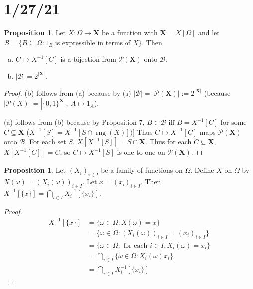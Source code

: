 \documentclass{article}
\DeclareMathOperator{\rng}{rng}
\theoremstyle{definition}
\newtheorem{proposition}[theorem]{Proposition}
\begin{document}
\section*{1/27/21}
\begin{proposition}
Let $X: \Omega \longrightarrow \mathbf{X}$ be a function with $\mathbf{X} = X[\Omega]$ and let $\mathscr{B} = \{B \subseteq \Omega : 1_B$ is expressible in terms of $X\}$.
Then
\begin{enumerate}[(a)]
    \item $C \mapsto X^{-1}[C]$ is a bijection from $\mathcal{P}(\mathbf{X})$ onto $\mathscr{B}$.
    \item $|\mathscr{B}| = 2^{|\mathbf{X}|}$.
\end{enumerate}
\end{proposition}
\begin{proof}
(b) follows from (a) because by (a) $|\mathscr{B}| = |\mathcal{P}(\mathbf{X})| := 2^{|\mathbf{X}|}$ (because $|\mathcal{P}(X)| = |\{0,1\}^\mathbf{X}|, \ A \mapsto 1_A$).

(a) follows from (b) because by Proposition 7, $B \in \mathscr{B}$ iff $B=X^{-1}[C]$ for some $C \subseteq \mathbf{X}$ ($X^{-1}[S] = X^{-1}[S \cap \rng (X)])]$
Thus $C \mapsto X^{-1}[C]$ maps $\mathcal{P}(\mathbf{X})$ onto $\mathscr{B}$.
For each set $S$, $X[X^{-1}[S]] = S \cap \mathbf{X}$.
Thus for each $C \subseteq \mathbf{X}$, $X[X^{-1}[C]] = C$, so $C \mapsto X^{-1}[S]$ is one-to-one on $\mathcal{P}(\mathbf{X})$.
\end{proof}

\begin{proposition}
Let $(X_i)_{i \in I}$ be a family of functions on $\Omega$. Define $X$ on $\Omega$ by $X(\omega) = (X_i (\omega))_{i \in I}$. Let $x = (x_i)_{i \in I}$. Then $X^{-1}[\{x\}] = \bigcap_{i \in I} X_i^{-1}[\{x_i\}]$.
\end{proposition}

\begin{proof}
    \begin{align*}
        X^{-1}[\{x\}] &= \{\omega \in \Omega : X(\omega) = x\} \\
            &= \{\omega \in \Omega : (X_i(\omega))_{i \in I} = (x_i)_{i\in I}\} \\
            &= \{\omega \in \Omega : \text{ for each } i\in I, X_i(\omega) = x_i\} \\
            &= \bigcap_{i \in I}\{\omega \in \Omega : X_i(\omega) x_i\} \\
            &= \bigcap_{i \in I} X_i^{-1}[\{x_i\}]
    \end{align*}
\end{proof}
\end{document}
